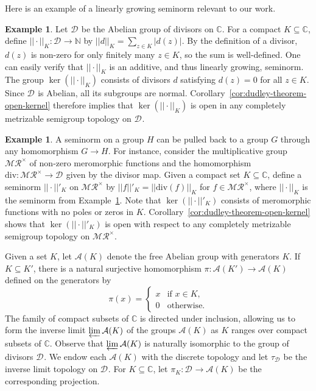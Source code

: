 \documentclass[12pt]{paper}
\numberwithin{equation}{section}
\theoremstyle{plain}
\theoremstyle{definition}
\newtheorem{exmpl}[theorem]{Example}
\newcommand{\C}{\mathbb{C}}
\newcommand{\N}{\mathbb{N}}
\newcommand{\merom}[1][]{\mathcal{MR}_{#1}}
\newcommand{\meromnz}{\merom^{\times}}
\newcommand{\divis}[1][]{\mathcal{D}_{#1}}
\newcommand{\dm}{\mathrm{div}}      %
\newcommand{\norm}[1]{||#1||}
\newcommand{\freeab}{\mathcal{A}}
\begin{document}
Here is an example of a linearly growing seminorm relevant to our work.

\begin{exmpl}
  \label{exmpl:divisors-seminorm}
  Let \(\divis\) be the Abelian group of divisors on \(\C\).  For a compact \(K \subseteq \C\),
  define \(\norm{\cdot}_{K} : \divis \to \N\) by \(\norm{d}_{K} = \sum_{z \in K}|d(z)|\).  By the
  definition of a divisor, \(d(z)\) is non-zero for only finitely many \(z \in K\), so the sum is
  well-defined.  One can easily verify that \(\norm{\cdot}_{K}\) is an additive, and thus linearly
  growing, seminorm.  The group \(\ker(\norm{\cdot}_{K})\) consists of divisors \(d\) satisfying
  \(d(z) = 0\) for all \(z \in K\).  Since \(\divis\) is Abelian, all its subgroups are normal.
  Corollary~\ref{cor:dudley-theorem-open-kernel} therefore implies that \(\ker(\norm{\cdot}_{K})\)
  is open in any completely metrizable semigroup topology on \(\divis\).
\end{exmpl}

\begin{exmpl}
  \label{exmpl:meromorphic-seminorm}
  A seminorm on a group \(H\) can be pulled back to a group \(G\) through any homomorphism
  \(G \to H\).  For instance, consider the multiplicative group \(\meromnz\) of non-zero meromorphic
  functions and the homomorphism \(\dm : \meromnz \to \divis\) given by the divisor map.  Given a
  compact set \(K \subseteq \C\), define a seminorm \(\norm{\cdot}'_K\) on \(\meromnz\) by
  \(\norm{f}'_{K} = \norm{\dm(f)}_{K}\) for \(f \in \meromnz\), where \(\norm{\cdot}_{K}\) is the
  seminorm from Example~\ref{exmpl:divisors-seminorm}. Note that \(\ker(\norm{\cdot}'_K)\) consists
  of meromorphic functions with no poles or zeros in \(K\).
  Corollary~\ref{cor:dudley-theorem-open-kernel} shows that \(\ker(\norm{\cdot}'_K)\) is open with
  respect to any completely metrizable semigroup topology on \(\meromnz\).
\end{exmpl}

Given a set \(K\), let \(\freeab(K)\) denote the free Abelian group with generators \(K\).  If
\(K \subseteq K'\), there is a natural surjective homomorphism \(\pi : \freeab(K') \to \freeab(K)\)
defined on the generators by
\[\pi(x) =
  \begin{cases}
    x & \textrm{if } x \in K,\\
    0 & \textrm{otherwise}.
  \end{cases}
\]
The family of compact subsets of \(\C\) is directed under inclusion, allowing us to form the inverse
limit \(\varprojlim \freeab(K)\) of the groups \(\freeab(K)\) as \(K\) ranges over compact subsets
of \(\C\).  Observe that \(\varprojlim \freeab(K)\) is naturally isomorphic to the group of divisors
\(\divis\).  We endow each \(\freeab(K)\) with the discrete topology and let \(\tau_{\divis}\) be
the inverse limit topology on \(\divis\).  For \(K \subseteq \C\), let
\(\pi_{K} : \divis \to \freeab(K)\) be the corresponding projection.
\end{document}
